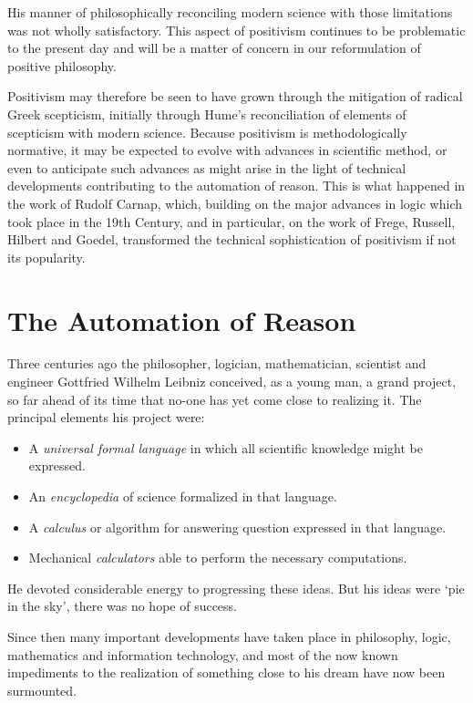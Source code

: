 His manner of philosophically reconciling modern science with those limitations was not wholly satisfactory.
This aspect of positivism continues to be problematic to the present day and will be
a matter of concern in our reformulation of positive philosophy.

Positivism may therefore be seen to have grown through the mitigation of radical
Greek scepticism, initially through Hume's reconciliation of elements of scepticism
with modern science.
Because positivism is methodologically normative, it may be expected to evolve with advances in scientific method, or even to anticipate such advances as might arise in the light of technical developments contributing to the automation of reason.
This is what happened in the work of Rudolf Carnap, which, building on the major advances in logic which took place in the 19th Century, and in particular, on the work of Frege, Russell, Hilbert and Goedel, transformed the technical sophistication of positivism if not its popularity.

\section{The Automation of Reason}

Three centuries ago the philosopher, logician, mathematician,
scientist and engineer Gottfried Wilhelm Leibniz conceived, as a young
man, a grand project, so far ahead of its time that no-one has yet
come close to realizing it.
The principal elements his project were:
\begin{itemize}
\item A {\it universal formal language} in which all scientific
  knowledge might be expressed.
\item An {\it encyclopedia} of science formalized in that language.
\item A {\it calculus} or algorithm for answering question expressed
  in that language.
\item Mechanical {\it calculators} able to perform the necessary computations.
\end{itemize}

He devoted considerable energy to progressing these ideas.
But his ideas were `pie in the sky', there was no hope of success.

Since then many important developments have taken place in philosophy,
logic, mathematics and information technology, and most of the now known
impediments to the realization of something close to his dream have
now been surmounted.

